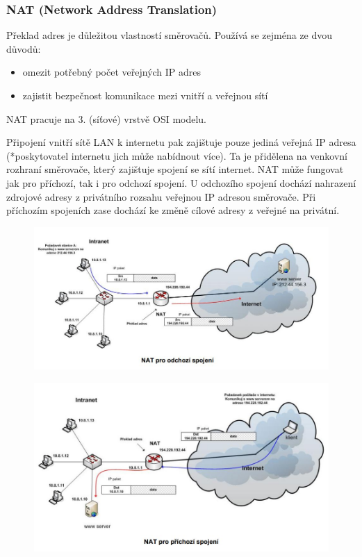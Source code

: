 \subsubsection{NAT (Network Address Translation)}
Překlad adres je důležitou vlastností směrovačů. Používá se zejména ze dvou důvodů:
\begin{itemize}
	\item omezit potřebný počet veřejných IP adres
	\item zajistit bezpečnost komunikace mezi vnitří a veřejnou sítí
\end{itemize}
NAT pracuje na 3. (síťové) vrstvě OSI modelu. 

Připojení vnitří sítě LAN k internetu pak zajištuje pouze jediná veřejná IP adresa (*poskytovatel internetu jich může nabídnout více).
Ta je přidělena na venkovní rozhraní směrovače, který zajištuje spojení se sítí internet. NAT může fungovat jak pro příchozí, tak i pro odchozí spojení.
U odchozího spojení dochází nahrazení zdrojové adresy z privátního rozsahu veřejnou IP adresou směrovače. Při příchozím spojeních zase dochází ke změně cílové adresy z veřejné na privátní.
\begin{figure}[H]
\centering
\includegraphics[width=1\textwidth]{assets/6_nat_out}
\end{figure}

\begin{figure}[H]
\centering
\includegraphics[width=1\textwidth]{assets/6_nat_in}
\end{figure}


